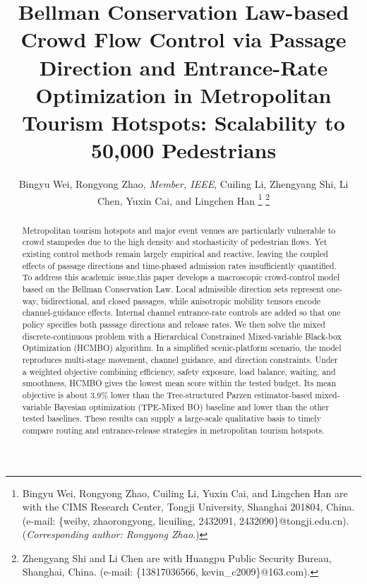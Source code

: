 \documentclass[lettersize,journal]{IEEEtran}
\begin{document}
\title{Bellman Conservation Law-based Crowd Flow Control via Passage Direction and Entrance-Rate Optimization in Metropolitan Tourism Hotspots: Scalability to 50,000 Pedestrians}

\author{Bingyu Wei, Rongyong Zhao, \textit{Member, IEEE}, Cuiling Li, Zhengyang Shi, Li Chen, Yuxin Cai, and Lingchen Han
\thanks{Bingyu Wei, Rongyong Zhao, Cuiling Li, Yuxin Cai, and Lingchen Han are with the CIMS Research Center, Tongji University, Shanghai 201804, China. (e-mail: \{weiby, zhaorongyong, licuiling, 2432091, 2432090\}@tongji.edu.cn). (\textit{Corresponding author: Rongyong Zhao}.)}
\thanks{Zhengyang Shi and Li Chen are with Huangpu Public Security Bureau, Shanghai, China. (e-mail: \{13817036566, kevin\_c2009\}@163.com).}}


\maketitle

\begin{abstract}
Metropolitan tourism hotspots and major event venues are particularly vulnerable to crowd stampedes due to the high density and stochasticity of pedestrian flows. Yet existing control methods remain largely empirical and reactive, leaving the coupled effects of passage directions and time-phased admission rates insufficiently quantified. To address this academic issue,this paper develops a macroscopic crowd-control model based on the Bellman Conservation Law. Local admissible direction sets represent one-way, bidirectional, and closed passages, while anisotropic mobility tensors encode channel-guidance effects. Internal channel entrance-rate controls are added so that one policy specifies both passage directions and release rates. We then solve the mixed discrete-continuous problem with a Hierarchical Constrained Mixed-variable Black-box Optimization (HCMBO) algorithm. In a simplified scenic-platform scenario, the model reproduces multi-stage movement, channel guidance, and direction constraints. Under a weighted objective combining efficiency, safety exposure, load balance, waiting, and smoothness, HCMBO gives the lowest mean score within the tested budget. Its mean objective is about 3.9\% lower than the Tree-structured Parzen estimator-based mixed-variable Bayesian optimization (TPE-Mixed BO) baseline and lower than the other tested baselines. These results can supply a large-scale qualitative basis to timely compare routing and entrance-release strategies in metropolitan tourism hotspots.
\end{abstract}
\end{document}
